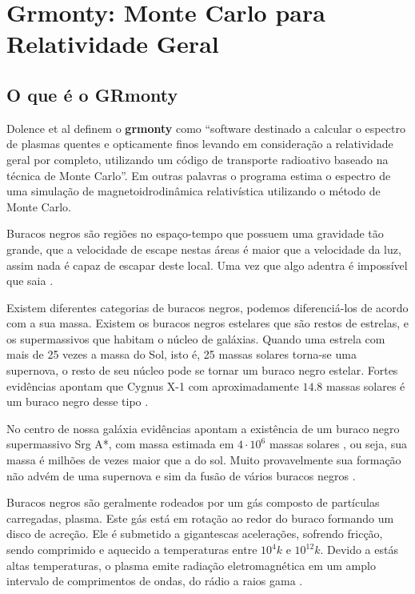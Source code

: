 \chapter{Grmonty: Monte Carlo para Relatividade Geral}
\label{cap:grmonty}

\section{O que é o GRmonty}
  Dolence et al definem o \textbf{grmonty} como ``software destinado a calcular o espectro de plasmas quentes e opticamente finos levando em consideração a relatividade geral por completo, utilizando um código de transporte radioativo baseado na técnica de Monte Carlo''\citep[p.1, traduzido]{Dolence:09}. Em outras palavras o programa estima o espectro de uma simulação de magnetoidrodinâmica \cite{eletro-hidro-dynamic:42} relativística utilizando o método de Monte Carlo.

  Buracos negros são regiões no espaço-tempo que possuem uma gravidade tão grande, que a velocidade de escape nestas áreas é maior que a velocidade da luz, assim nada é capaz de escapar deste local. Uma vez que algo adentra é impossível que saia \cite{fatalgravity:10}.

  Existem diferentes categorias de buracos negros, podemos diferenciá-los de acordo com a sua massa. Existem os buracos negros estelares que são restos de estrelas, e os supermassivos que habitam o núcleo de galáxias. Quando uma estrela com mais de 25 vezes a massa do Sol, isto é, 25 massas solares torna-se uma supernova, o resto de seu núcleo pode se tornar um buraco negro estelar. Fortes evidências apontam que Cygnus X-1 com aproximadamente $14.8$ massas solares é um buraco negro desse tipo \cite{cygx1:11}.

  No centro de nossa galáxia evidências apontam a existência de um buraco negro supermassivo Srg A*, com massa estimada em $4 \cdot 10^6$ massas solares \cite{2016ApJ...830...17B}, ou seja, sua massa é milhões de vezes maior que a do sol. Muito provavelmente sua formação não advém de uma supernova e sim da fusão de vários buracos negros \cite{fatalgravity:10}.

  Buracos negros são geralmente rodeados por um gás composto de partículas carregadas, plasma. Este gás está em rotação ao redor do buraco formando um disco de acreção. Ele é submetido a gigantescas acelerações, sofrendo fricção, sendo comprimido e aquecido a temperaturas entre $10^4k$ e $10^{12}k$. Devido a estás altas temperaturas, o plasma emite radiação eletromagnética em um amplo intervalo de comprimentos de ondas, do rádio a raios gama \cite{1969Natur.223..690L}.
  
